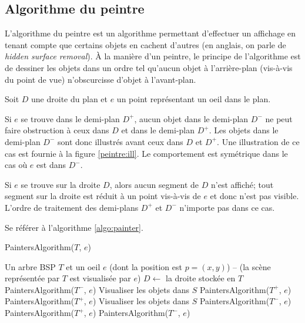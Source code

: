 \subsection{Algorithme du peintre}
L'algorithme du peintre est un algorithme permettant d'effectuer un
affichage en tenant compte que certains objets en cachent d'autres
(en anglais, on parle de \emph{hidden surface removal}).
\`{A} la manière d'un peintre,
le principe de l'algorithme est
de dessiner les objets dans un ordre tel qu'aucun objet à l'arrière-plan
(vis-à-vis du point de vue) n'obscurcisse d'objet à l'avant-plan.

Soit $D$ une droite du plan et $e$ un point représentant un oeil dans
le plan.

Si $e$ se trouve dans le demi-plan $D^+$, aucun objet dans le
demi-plan $D^-$ ne peut faire obstruction à ceux dans $D$ et dans le
demi-plan $D^+$. Les objets dans le demi-plan $D^-$ sont donc
\og{}illustrés\fg{} avant ceux dans $D$ et $D^+$.
Une illustration de ce cas est fournie à la figure \ref{peintre:ill}.
Le comportement est symétrique dans le cas où $e$ est dans $D^-$.



Si $e$ se trouve sur la droite $D$, alors aucun segment de $D$ n'est affiché;
tout segment sur la droite est réduit à un point vis-à-vis de $e$ et donc n'est
pas visible. L'ordre de traitement des demi-plans $D^+$ et $D^-$ n'importe
pas dans ce cas.

Se référer à l'algorithme \ref{algo:painter}.

\begin{algorithm}
  \caption{PaintersAlgorithm($T$, $e$)}
  \begin{algorithmic}[1] \label{algo:painter}
    \REQUIRE Un arbre BSP $T$ et un oeil $e$ (dont la position est $p=(x, y)$)
    \ENSURE -- (la scène représentée par $T$ est visualisée par $e$)
    \STATE $D\leftarrow$ la droite stockée en $T$
    \STATE PaintersAlgorithm($T^-$, $e$)
    \STATE Visualiser les objets dans $S$
    \STATE PaintersAlgorithm($T^+$, $e$)
    \STATE PaintersAlgorithm($T^+$, $e$)
    \STATE Visualiser les objets dans $S$
    \STATE PaintersAlgorithm($T^-$, $e$)
    \ELSE
    \STATE PaintersAlgorithm($T^+$, $e$)
    \STATE PaintersAlgorithm($T^-$, $e$)
    \ENDIF
    \ENDIF
  \end{algorithmic}
\end{algorithm}

